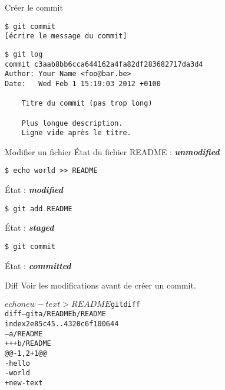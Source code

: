 \begin{frame}[fragile]{Créer le commit}
\begin{footnotesize}
\begin{verbatim}
$ git commit
[écrire le message du commit]
\end{verbatim}

\pause
\begin{verbatim}
$ git log
commit c3aab8bb6cca644162a4fa82df283682717da3d4
Author: Your Name <foo@bar.be>
Date:   Wed Feb 1 15:19:03 2012 +0100

    Titre du commit (pas trop long)

    Plus longue description.
    Ligne vide après le titre.
\end{verbatim}
\end{footnotesize}
\end{frame}

\begin{frame}[fragile]{Modifier un fichier}
État du fichier README : \textit{\textbf{unmodified}}

\pause
\begin{footnotesize}
\begin{verbatim}
$ echo world >> README
\end{verbatim}
\end{footnotesize}

État : \textit{\textbf{modified}}

\pause
\begin{footnotesize}
\begin{verbatim}
$ git add README
\end{verbatim}
\end{footnotesize}

État : \textit{\textbf{staged}}

\pause
\begin{footnotesize}
\begin{verbatim}
$ git commit
\end{verbatim}
\end{footnotesize}

État : \textit{\textbf{committed}}
\end{frame}

\begin{frame}[fragile]{Diff}
  Voir les modifications avant de créer un commit.
\begin{small}
\begin{alltt}
$ echo new-text > README

$ git diff
diff --git a/README b/README
index 2e85c45..4320c6f 100644
--- a/README
+++ b/README
\textcolor{ansicyan}{@@ -1,2 +1 @@}
\textcolor{ansired}{-hello
-world}
\textcolor{ansigreen}{+new-text}
\end{alltt}
\end{small}
\end{frame}

